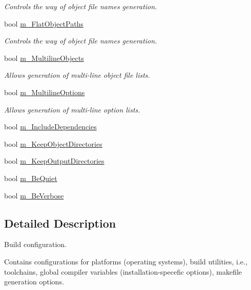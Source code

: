 \begin{DoxyCompactItemize}
\begin{DoxyCompactList}\small\item\em Controls the way of object file names generation. \end{DoxyCompactList}\item 
bool \hyperlink{classCCodeBlocksBuildConfig_a0bcabddaab973e27b714855c082a2cbd}{m\-\_\-\-Flat\-Object\-Paths}
\begin{DoxyCompactList}\small\item\em Controls the way of object file names generation. \end{DoxyCompactList}\item 
bool \hyperlink{classCCodeBlocksBuildConfig_a5290986e23b464ce386a12c809b3d531}{m\-\_\-\-Multiline\-Objects}
\begin{DoxyCompactList}\small\item\em Allows generation of multi-\/line object file lists. \end{DoxyCompactList}\item 
bool \hyperlink{classCCodeBlocksBuildConfig_a6d3348032b885c569b5cd35955e0125d}{m\-\_\-\-Multiline\-Options}
\begin{DoxyCompactList}\small\item\em Allows generation of multi-\/line option lists. \end{DoxyCompactList}\item 
bool \hyperlink{classCCodeBlocksBuildConfig_a6c5a833fdccaa0e15f54985762cf903b}{m\-\_\-\-Include\-Dependencies}
\item 
bool \hyperlink{classCCodeBlocksBuildConfig_af55874cd3fca990d090889ce75597a91}{m\-\_\-\-Keep\-Object\-Directories}
\item 
bool \hyperlink{classCCodeBlocksBuildConfig_a19eec6d82fbfb156e3939669dc9b5d94}{m\-\_\-\-Keep\-Output\-Directories}
\item 
bool \hyperlink{classCCodeBlocksBuildConfig_a89e06222a6f380d708357f1cedcfac43}{m\-\_\-\-Be\-Quiet}
\item 
bool \hyperlink{classCCodeBlocksBuildConfig_ae5a32f86104366595bb045f809cc5d5a}{m\-\_\-\-Be\-Verbose}
\end{DoxyCompactItemize}


\subsection{Detailed Description}
Build configuration. 

Contains configurations for platforms (operating systems), build utilities, i.\-e., toolchains, global compiler variables (installation-\/specefic options), makefile generation options. 

